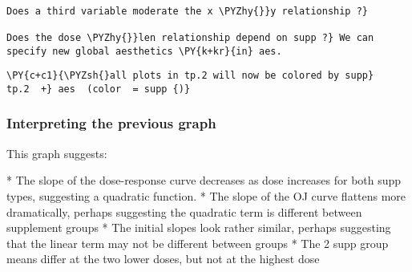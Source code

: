     
    
    \begin{center}
    \end{center}
    { \hspace*{\fill} \\}
    
    \begin{tcolorbox}[breakable, size=fbox, boxrule=1pt, pad at break*=1mm,colback=cellbackground, colframe=cellborder]
\begin{Verbatim}[commandchars=\\\{\}]
Does a third variable moderate the x \PYZhy{}}y relationship ?}

Does the dose \PYZhy{}}len relationship depend on supp ?} We can specify new global aesthetics \PY{k+kr}{in} aes.
\end{Verbatim}
\end{tcolorbox}

    \begin{tcolorbox}[breakable, size=fbox, boxrule=1pt, pad at break*=1mm,colback=cellbackground, colframe=cellborder]
\begin{Verbatim}[commandchars=\\\{\}]
\PY{c+c1}{\PYZsh{}all plots in tp.2 will now be colored by supp}
tp.2  +} aes  (color  = supp {)}
\end{Verbatim}
\end{tcolorbox}

    \subsubsection{Interpreting the previous
graph}\label{interpreting-the-previous-graph}

This graph suggests:

\begin{enumerate}
\def\labelenumi{\arabic{enumi}.}

* 
  The slope of the dose-response curve decreases as dose increases for
  both supp types, suggesting a quadratic function.
* 
  The slope of the OJ curve flattens more dramatically, perhaps
  suggesting the quadratic term is different between supplement groups
* 
  The initial slopes look rather similar, perhaps suggesting that the
  linear term may not be different between groups
* 
  The 2 supp group means differ at the two lower doses, but not at the
  highest dose
\end{enumerate}

